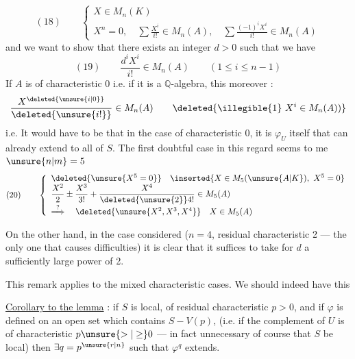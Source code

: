 \[
(18)\qquad
\left\{\begin{array}{l}
X\in M_n(K)\\
X^n=0,\quad\displaystyle\sum\frac{X^i}{i!}\in M_n(A),\quad
\displaystyle\sum\frac{(-1)^iX^i}{i!}\in M_n(A)
\end{array}\right.
\]
and we want to show that there exists an integer $d>0$ such that we have
\[
(19)\qquad\frac{d^iX^i}{i!}\in M_n(A)\qquad(1\leq i\leq n-1)
\]
If $A$ is of characteristic 0 i.e. if it is a $\mathbb Q$-algebra, this   moreover :
\[
\frac{X^{\deleted{\unsure{i|0}}}}{\deleted{\unsure{i!}}}\in M_n(A)
\qquad\deleted{\text{\illegible{1}}\ X^i\in M_n(A))}
\]
i.e. It would have to be that in the case of characteristic 0, it is $\varphi_U$ itself that can already extend to all of $S$. The first doubtful case in this regard seems to me $\unsure{n|m}=5$
\[
(20)\qquad\left\{\begin{array}{l}
\deleted{\unsure{X^5=0}}\quad\inserted{X\in M_5(\unsure{A|K}),\ X^5=0}\\
\displaystyle\frac{X^2}{2}\pm\frac{X^3}{3!}+\frac{X^4}{\deleted{\unsure{2}}4!}\in M_5(A)\\[3pt]
\overset{?}{\Longrightarrow}\quad\deleted{\unsure{X^2,X^3,X^4}}\quad X\in M_5(A)
\end{array}\right.
\]

On the other hand, in the case considered  ($n=4$, residual characteristic 2 --- the only one that causes difficulties) it is clear that it suffices to take for $d$ a sufficiently large power of 2.

This remark applies to the mixed characteristic cases. We should indeed have this

\uline{Corollary to the lemma}  : if $S$ is local, of residual characteristic $p>0$, and if $\varphi$ is defined on an open set which contains $S-V(p)$, (i.e. if the complement of $U$ is of characteristic $p\unsure{>|\geq}0$ --- in fact unnecessary of course that $S$ be local) then $\exists q=p^{\unsure{r|n}}$ such that $\varphi^q$ extends.

